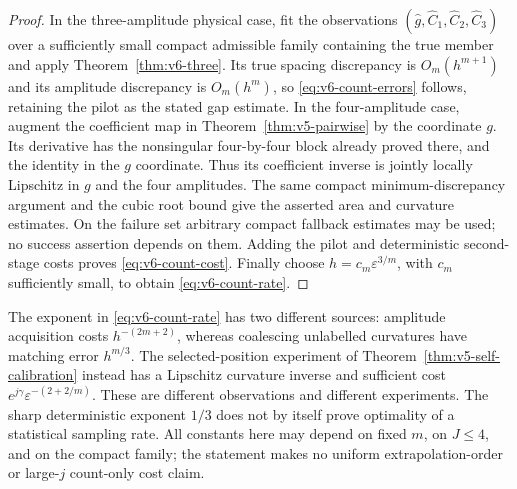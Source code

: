 \begin{proof}
In the three-amplitude physical case, fit the observations
$(\widehat g,\widehat C_1,\widehat C_2,\widehat C_3)$ over a sufficiently
small compact admissible family containing the true member and apply
Theorem~\ref{thm:v6-three}. Its true spacing discrepancy is
$O_m(h^{m+1})$ and its amplitude discrepancy is $O_m(h^m)$, so
\eqref{eq:v6-count-errors} follows, retaining the pilot as the stated
gap estimate. In the four-amplitude case, augment the coefficient map
in Theorem~\ref{thm:v5-pairwise} by the coordinate $g$. Its derivative
has the nonsingular four-by-four block already proved there, and the
identity in the $g$ coordinate. Thus its coefficient inverse is jointly
locally Lipschitz in $g$ and the four amplitudes. The same compact
minimum-discrepancy argument and the cubic root bound give the asserted
area and curvature estimates. On the failure set arbitrary compact
fallback estimates may be used; no success assertion depends on them.
Adding the pilot and deterministic second-stage costs proves
\eqref{eq:v6-count-cost}. Finally choose $h=c_m\varepsilon^{3/m}$,
with $c_m$ sufficiently small, to obtain \eqref{eq:v6-count-rate}.
\end{proof}

The exponent in \eqref{eq:v6-count-rate} has two different sources:
amplitude acquisition costs $h^{-(2m+2)}$, whereas coalescing unlabelled
curvatures have matching error $h^{m/3}$. The selected-position
experiment of Theorem~\ref{thm:v5-self-calibration} instead has a
Lipschitz curvature inverse and sufficient cost
$e^{j\gamma}\varepsilon^{-(2+2/m)}$. These are different observations
and different experiments. The sharp deterministic exponent $1/3$
does not by itself prove optimality of a statistical sampling rate.
All constants here may depend on fixed $m$, on $J\le4$, and on the
compact family; the statement makes no uniform extrapolation-order or
large-$j$ count-only cost claim.
